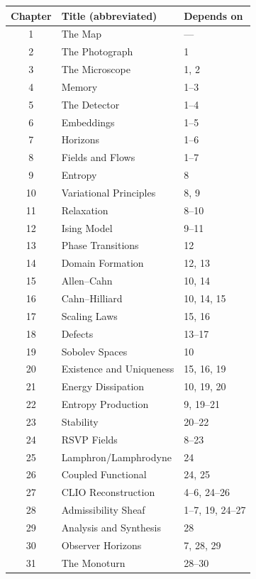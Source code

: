 \begin{center}
\begin{tabular}{@{}cll@{}}
\toprule
\textbf{Chapter} & \textbf{Title (abbreviated)} &
\textbf{Depends on} \\
\midrule
1  & The Map             & --- \\
2  & The Photograph      & 1 \\
3  & The Microscope      & 1, 2 \\
4  & Memory              & 1--3 \\
5  & The Detector        & 1--4 \\
6  & Embeddings          & 1--5 \\
7  & Horizons            & 1--6 \\
\midrule
8  & Fields and Flows    & 1--7 \\
9  & Entropy             & 8 \\
10 & Variational Principles & 8, 9 \\
11 & Relaxation          & 8--10 \\
\midrule
12 & Ising Model         & 9--11 \\
13 & Phase Transitions   & 12 \\
14 & Domain Formation    & 12, 13 \\
15 & Allen--Cahn         & 10, 14 \\
16 & Cahn--Hilliard      & 10, 14, 15 \\
17 & Scaling Laws        & 15, 16 \\
18 & Defects             & 13--17 \\
\midrule
19 & Sobolev Spaces      & 10 \\
20 & Existence and Uniqueness & 15, 16, 19 \\
21 & Energy Dissipation  & 10, 19, 20 \\
22 & Entropy Production  & 9, 19--21 \\
23 & Stability           & 20--22 \\
\midrule
24 & RSVP Fields         & 8--23 \\
25 & Lamphron/Lamphrodyne & 24 \\
26 & Coupled Functional  & 24, 25 \\
27 & CLIO Reconstruction & 4--6, 24--26 \\
28 & Admissibility Sheaf & 1--7, 19, 24--27 \\
29 & Analysis and Synthesis & 28 \\
30 & Observer Horizons   & 7, 28, 29 \\
31 & The Monoturn        & 28--30 \\

\end{tabular}
\end{center}

